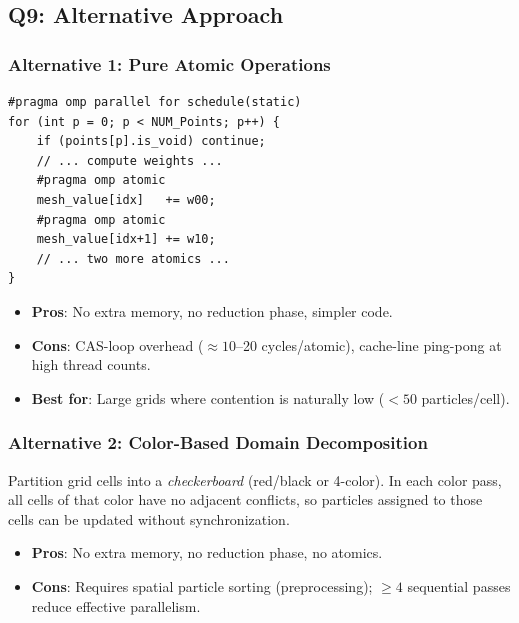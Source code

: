 \documentclass[12pt,a4paper]{article}
\begin{document}
\subsection{Q9: Alternative Approach}

\subsubsection{Alternative 1: Pure Atomic Operations}

\begin{lstlisting}[caption={Pure atomic approach for interpolation}]
#pragma omp parallel for schedule(static)
for (int p = 0; p < NUM_Points; p++) {
    if (points[p].is_void) continue;
    // ... compute weights ...
    #pragma omp atomic
    mesh_value[idx]   += w00;
    #pragma omp atomic
    mesh_value[idx+1] += w10;
    // ... two more atomics ...
}
\end{lstlisting}

\begin{itemize}
    \item \textbf{Pros}: No extra memory, no reduction phase, simpler code.
    \item \textbf{Cons}: CAS-loop overhead ($\approx\!10$--20 cycles/atomic), cache-line
          ping-pong at high thread counts.
    \item \textbf{Best for}: Large grids where contention is naturally low
          ($<50$ particles/cell).
\end{itemize}

\subsubsection{Alternative 2: Color-Based Domain Decomposition}

Partition grid cells into a \textit{checkerboard} (red/black or 4-color). In each color
pass, all cells of that color have no adjacent conflicts, so particles assigned to those
cells can be updated without synchronization.

\begin{itemize}
    \item \textbf{Pros}: No extra memory, no reduction phase, no atomics.
    \item \textbf{Cons}: Requires spatial particle sorting (preprocessing); $\geq 4$
          sequential passes reduce effective parallelism.
\end{itemize}
\end{document}
